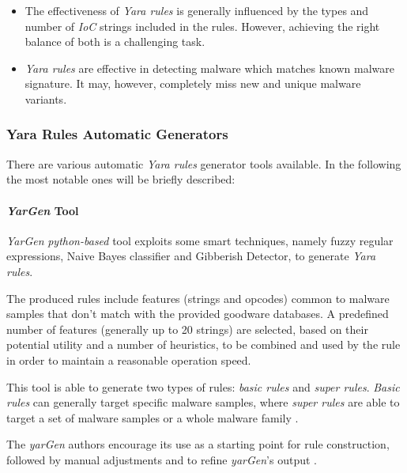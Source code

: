 \documentclass[pdfa%
,cucitura%
]{toptesi}
\begin{document}
\begin{enumerate}
\begin{itemize}
		\item The effectiveness of \textit{Yara rules} is generally influenced by the types and number of \textit{IoC} strings included in the rules. However, achieving the right balance of both is a challenging task.
		
		\item \textit{Yara rules} are effective in detecting malware which matches known malware signature. It may, however, completely miss new and unique malware variants.
	\end{itemize}
\end{enumerate}

\subsubsection{Yara Rules Automatic Generators}
There are various automatic \textit{Yara rules} generator tools available. In the following the most notable ones will be briefly described:

\paragraph{\textit{YarGen} Tool}
\textit{YarGen} \textit{python-based} tool exploits some smart techniques, namely fuzzy regular expressions, Naive Bayes classifier and Gibberish Detector, to generate \textit{Yara rules}. 

The produced rules include features (strings and opcodes) common to malware samples that don't match with the provided goodware databases. A predefined number of features (generally up to 20 strings) are selected, based on their potential utility and a number of heuristics, to be combined and used by the rule in order to maintain a reasonable operation speed.

This tool is able to generate two types of rules: \textit{basic rules} and \textit{super rules}. \textit{Basic rules} can generally target specific malware samples, where \textit{super rules} are able to target a set of malware samples or a whole malware family \cite{NaikEAGYRETE}.

The \textit{yarGen} authors encourage its use as a starting point for rule construction, followed by manual adjustments and to refine \textit{yarGen}'s output \cite{RaffAYRGUB}.
\end{document}
